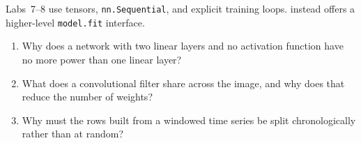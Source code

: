 \begin{libnote}
Labs~7--8 use  tensors, \texttt{nn.Sequential}, and explicit training loops.  instead offers a higher-level \texttt{model.fit} interface.
\end{libnote}





\begin{quickcheck}
\begin{enumerate}
  \item Why does a network with two linear layers and no activation function have no more power than one linear layer?
  \item What does a convolutional filter share across the image, and why does that reduce the number of weights?
  \item Why must the rows built from a windowed time series be split chronologically rather than at random?
\end{enumerate}
\end{quickcheck}
